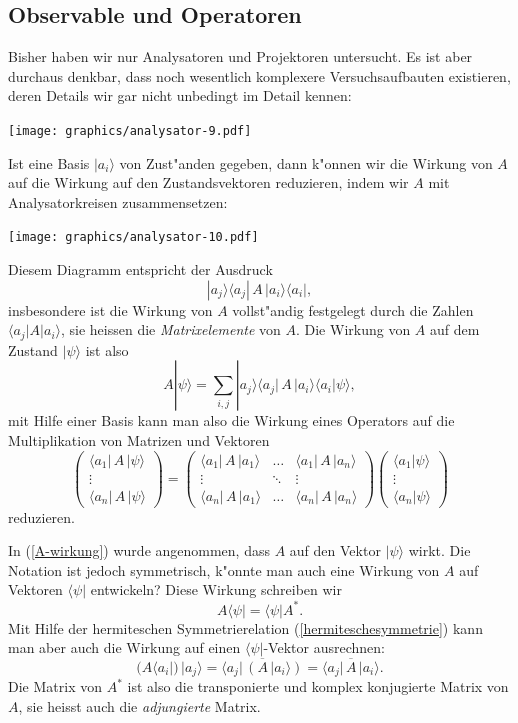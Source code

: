 \subsection{Observable und Operatoren}
Bisher haben wir nur Analysatoren und Projektoren untersucht.
Es ist aber durchaus denkbar, dass noch wesentlich komplexere
Versuchsaufbauten existieren, deren Details wir gar nicht unbedingt
im Detail kennen:
\begin{center}
\texttt{[image: graphics/analysator-9.pdf]}
\end{center}
Ist eine Basis $|a_i\rangle$ von Zust"anden gegeben, dann k"onnen
wir die Wirkung von $A$ auf die Wirkung auf den Zustandsvektoren
reduzieren, indem wir $A$ mit Analysatorkreisen zusammensetzen:
\begin{center}
\texttt{[image: graphics/analysator-10.pdf]}
\end{center}
Diesem Diagramm entspricht der Ausdruck
\[
|a_j\rangle \langle a_j|\, A \,|a_i\rangle \langle a_i|,
\]
insbesondere ist die Wirkung von $A$ vollst"andig festgelegt durch die
Zahlen
$\langle a_j|A|a_i\rangle$, sie heissen die {\em Matrixelemente} von $A$.
Die Wirkung von $A$ auf dem Zustand $|\psi\rangle$ ist also
\begin{equation}
A|\psi\rangle = \sum_{i,j} |a_j\rangle
	\langle a_j|\,A\,|a_i\rangle
	\langle a_i|\psi\rangle,
\label{A-wirkung}
\end{equation}
mit Hilfe einer Basis kann man also die Wirkung eines Operators auf
die Multiplikation von Matrizen und Vektoren
\[
\begin{pmatrix}
\langle a_1|\,A\,|\psi\rangle\\
\vdots\\
\langle a_n|\,A\,|\psi\rangle
\end{pmatrix}
=
\begin{pmatrix}
\langle a_1|\,A\,|a_1\rangle&\dots &\langle a_1|\,A\,|a_n\rangle\\
\vdots                  &\ddots&\vdots                  \\
\langle a_n|\,A\,|a_1\rangle&\dots &\langle a_n|\,A\,|a_n\rangle
\end{pmatrix}
\begin{pmatrix}
\langle a_1|\psi\rangle\\
\vdots\\
\langle a_n|\psi\rangle
\end{pmatrix}
\]
reduzieren.

In (\ref{A-wirkung}) wurde angenommen, dass $A$ auf den Vektor
$|\psi\rangle$ wirkt. Die Notation ist jedoch symmetrisch, k"onnte
man auch eine Wirkung von $A$ auf Vektoren $\langle\psi|$ entwickeln?
Diese Wirkung schreiben wir
\[
A\langle \psi|=\langle\psi|A^*.
\]
Mit Hilfe der hermiteschen Symmetrierelation (\ref{hermiteschesymmetrie})
kann man aber auch die Wirkung auf einen $\langle\psi|$-Vektor ausrechnen:
\begin{equation}
(A\langle a_i|)\,|a_j\rangle
=
\overline{\langle a_j|\,(A\,|a_i\rangle)}
=
\overline{\langle a_j|\,A\,|a_i\rangle}.
\end{equation}
Die Matrix von $A^*$
ist also die transponierte und komplex konjugierte Matrix von $A$,
sie heisst auch die {\em adjungierte} Matrix.

